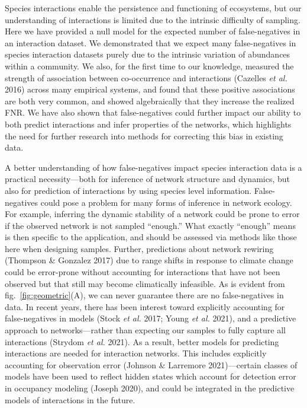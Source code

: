 \documentclass[11pt]{article}
\begin{document}
Species interactions enable the persistence and functioning of
ecosystems, but our understanding of interactions is limited due to the
intrinsic difficulty of sampling. Here we have provided a null model for
the expected number of false-negatives in an interaction dataset. We
demonstrated that we expect many false-negatives in species interaction
datasets purely due to the intrinsic variation of abundances within a
community. We also, for the first time to our knowledge, measured the
strength of association between co-occurrence and interactions (Cazelles
\emph{et al.} 2016) across many empirical systems, and found that these
positive associations are both very common, and showed algebraically
that they increase the realized FNR. We have also shown that
false-negatives could further impact our ability to both predict
interactions and infer properties of the networks, which highlights the
need for further research into methods for correcting this bias in
existing data.

A better understanding of how false-negatives impact species interaction
data is a practical necessity---both for inference of network structure
and dynamics, but also for prediction of interactions by using species
level information. False-negatives could pose a problem for many forms
of inference in network ecology. For example, inferring the dynamic
stability of a network could be prone to error if the observed network
is not sampled ``enough.'' What exactly ``enough'' means is then
specific to the application, and should be assessed via methods like
those here when designing samples. Further, predictions about network
rewiring (Thompson \& Gonzalez 2017) due to range shifts in response to
climate change could be error-prone without accounting for interactions
that have not been observed but that still may become climatically
infeasible. As is evident from fig.~\ref{fig:geometric}(A), we can never
guarantee there are no false-negatives in data. In recent years, there
has been interest toward explicitly accounting for false-negatives in
models (Stock \emph{et al.} 2017; Young \emph{et al.} 2021), and a
predictive approach to networks---rather than expecting our samples to
fully capture all interactions (Strydom \emph{et al.} 2021). As a
result, better models for predicting interactions are needed for
interaction networks. This includes explicitly accounting for
observation error (Johnson \& Larremore 2021)---certain classes of
models have been used to reflect hidden states which account for
detection error in occupancy modeling (Joseph 2020), and could be
integrated in the predictive models of interactions in the future.
\end{document}

